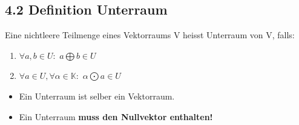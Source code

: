 \subsection{4.2 Definition Unterraum}{
\vskip1pt
Eine nichtleere Teilmenge eines Vektorraums V heisst Unterraum von V, falls:
\vskip6pt
\begin{enumerate}[label=\protect\circled{\arabic*}]
\item \hskip5pt $\forall a, b \in U:$ \hskip29pt $a \bigoplus b \in U$
\item \hskip5pt $\forall a \in U, \forall \alpha \in \mathbb{K}:$ \hskip10pt$ \alpha \bigodot a \in U$
\end{enumerate}

\begin{itemize}[leftmargin=0.29cm, itemsep=0.5pt]
\item Ein Unterraum ist selber ein Vektorraum.
\item Ein Unterraum \textbf{muss den Nullvektor enthalten!}
\end{itemize}
\vspace{-1.5mm}
}
\WhiteSpace